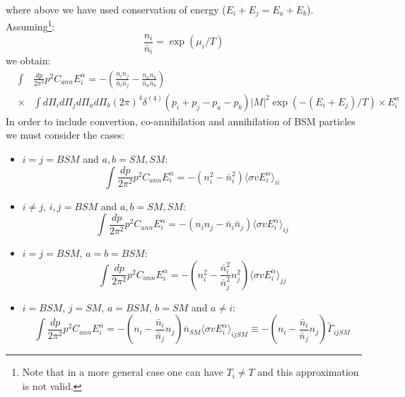 \documentclass[preprint,notoc]{JHEP3}
\begin{document}
where above we have used conservation of energy ($E_i + E_j = E_a + E_b$). Assuming\footnote{Note that in a more
general case one can have $T_i \neq T$ and this approximation is not valid.}:
\begin{equation}
\frac{n_i}{\bar{n}_i} = \exp(\mu_i/T)
\end{equation}
we obtain:
\begin{eqnarray}
& \int & \frac{dp}{2 \pi^2} p^2 C_{ann} E_i^{\alpha} = -\left( \frac{n_i n_j}{\bar{n}_i \bar{n}_j} - \frac{n_a n_b}{\bar{n}_a \bar{n}_b}\right) \nonumber \\
 & \times & \int  d\Pi_{i} d\Pi_{j} d\Pi_{a} d\Pi_{b} (2 \pi)^4 \delta^{(4)}(p_i + p_j - p_a - p_b) |M|^2 \exp(-(E_i + E_j)/T) \times E_i^{\alpha} \nonumber
\end{eqnarray}
In order to include convertion, co-annihilation and annihilation of BSM particles we must consider the cases:
\begin{itemize}
	\item $i = j = BSM$ and $a,b = SM,SM$:
	\begin{equation}
		\int \frac{dp}{2 \pi^2} p^2 C_{ann} E_i^{\alpha}  =  -\left( n_i^2 - \bar{n}_i^2 \right) \langle \sigma v E_i^{\alpha} \rangle_{ii} \label{eq:annihilation2}
	\end{equation} 

	\item $i \neq j$, $i,j = BSM$ and $a,b = SM,SM$:
	\begin{equation}
		\int \frac{dp}{2 \pi^2} p^2 C_{ann} E_i^{\alpha}  =  -\left( n_i n_j - \bar{n}_i \bar{n}_j \right) \langle \sigma v E_i^{\alpha} \rangle_{ij} \label{eq:coannihilation2}
	\end{equation} 

	\item $i =  j = BSM$, $ a = b = BSM$:
	\begin{equation}
		\int \frac{dp}{2 \pi^2} p^2 C_{ann} E_i^{\alpha}  =  -\left(n_i^2 - \frac{\bar{n}_i^2}{\bar{n}_j^2} n_j^2  \right) \langle \sigma v E_i^{\alpha} \rangle_{jj} \label{eq:thermal2}
	\end{equation} 

	\item $i = BSM$, $j = SM$, $ a = BSM$, $b = SM$ and $a \neq i$:
	\begin{equation}
		\int \frac{dp}{2 \pi^2} p^2 C_{ann} E_i^{\alpha}  =  -\left(n_i - \frac{\bar{n}_i}{\bar{n}_j} n_j  \right) \bar{n}_{SM} \langle \sigma v E_i^{\alpha} \rangle_{ijSM} \equiv  -\left(n_i - \frac{\bar{n}_i}{\bar{n}_j} n_j  \right) \tilde{\Gamma}_{ijSM} \label{eq:convertion2}
	\end{equation} 
	
\end{itemize}
\end{document}
